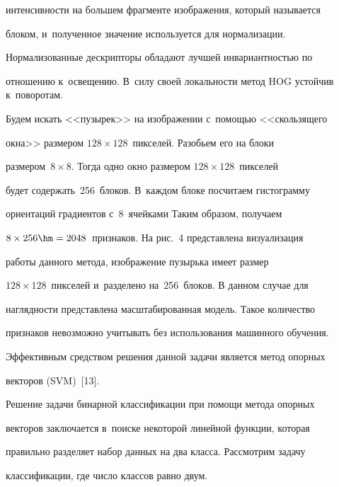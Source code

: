 интенсивности на большем фрагменте изображения, который называется 


блоком, и~полученное значение используется для нормализации. 


Нормализованные дескрипторы обладают лучшей инвариантностью по 


отношению к~освещению. В~силу своей локальности метод HOG устойчив к~поворотам.


   


   Будем искать <<пузырек>> на изображении с~помощью <<скользящего 


окна>> размером $128\times128$~пикселей. Разобьем его на блоки 


размером~$8\times8$. Тогда одно окно размером $128\times128$~пикселей 


будет содержать~256~блоков. В~каждом блоке посчитаем гистограмму 


ориентаций градиентов с~8~ячейками Таким образом, получаем 


$8\times256 \hm= 2048$~признаков. На рис.~4 представлена визуализация 


работы данного метода, изображение пузырька имеет размер 


$128\times128$~пикселей и~разделено на~256~блоков. В данном случае для 


наглядности представлена масштабированная модель. Такое количество 


признаков невозможно учитывать без использования машинного обучения. 


Эффективным средством решения данной задачи является метод опорных 


векторов (SVM)~[13].


   


   Решение задачи бинарной классификации при помощи метода опорных 


векторов заключается в~поиске некоторой линейной функции, которая 


правильно разделяет набор данных на два класса. Рассмотрим задачу 


классификации, где число классов равно двум.


   


